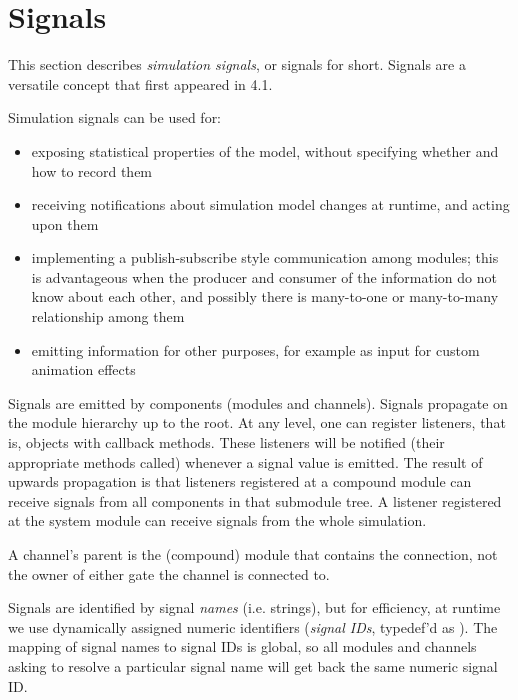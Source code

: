 \section{Signals}
\label{sec:simple-modules:signals}

This section describes \textit{simulation signals}, or signals for short.
Signals are a versatile concept that first appeared in {\opp} 4.1.

Simulation signals can be used for:

\begin{itemize}
  \item exposing statistical properties of the model, without specifying
        whether and how to record them
  \item receiving notifications about simulation model changes at runtime, and
        acting upon them
  \item implementing a publish-subscribe style communication among modules;
        this is advantageous when the producer and consumer of the information
        do not know about each other, and possibly there is many-to-one or
        many-to-many relationship among them
  \item emitting information for other purposes, for example as input for
        custom animation effects
\end{itemize}

Signals are emitted by components (modules and channels). Signals propagate on
the module hierarchy up to the root. At any level, one can register listeners,
that is, objects with callback methods. These listeners will be notified (their
appropriate methods called) whenever a signal value is emitted. The result of
upwards propagation is that listeners registered at a compound module can
receive signals from all components in that submodule tree. A listener
registered at the system module can receive signals from the whole simulation.

\begin{note}
    A channel's parent is the (compound) module that contains the connection,
    not the owner of either gate the channel is connected to.
\end{note}

Signals are identified by signal \textit{names} (i.e. strings), but for efficiency,
at runtime we use dynamically assigned numeric identifiers (\textit{signal IDs},
typedef'd as ). The mapping of signal names to signal IDs is
global, so all modules and channels asking to resolve a particular signal name
will get back the same numeric signal ID.

